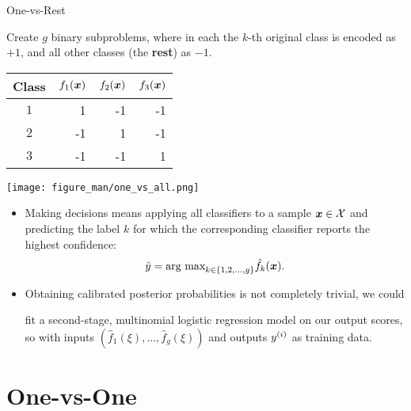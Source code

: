 \begin{vbframe}{One-vs-Rest }


Create $g$ binary subproblems, where in each the $k$-th original class is encoded as $+1$, and all other classes (the \textbf{rest}) as $- 1$.


\begin{table}[]
  \footnotesize
  \begin{tabular}{|c|r|r|r|} \hline
  \textbf{Class}  & \textbf{$f_1{(\bm{x})}$} & \textbf{$f_2{(\bm{x})}$}  & \textbf{$f_3{(\bm{x})}$} \\ \hline
  \textbf{$1$}  &   1                 &  -1                   &  -1                   \\ \hline
  \textbf{$2$}  &  -1                 &  1                   & -1                   \\ \hline
  \textbf{$3$}  &  -1                 & -1                   &  1                   \\ \hline
  \end{tabular}
  \end{table}


    \begin{center}
    \texttt{[image: figure\_man/one\_vs\_all.png]}
    \end{center}

  \begin{itemize}
    \item Making decisions means applying all classifiers to a sample $\bm{x} \in \mathcal{X}$ and predicting the label $k$ for which the corresponding classifier reports the highest confidence: 
    $$
      \hat y = \text{arg max}_{k \in \{1, 2, ..., g\}} \hat f_k(\bm{x}). 
    $$

    \item Obtaining calibrated posterior probabilities is not completely trivial, we could

    fit a second-stage, multinomial logistic regression model on our output scores, so with inputs $\left(\hat f_1(\xi), ..., \hat f_g(\xi)\right)$ and outputs $y^{(i)}$ as training data. 

  \end{itemize}
  \vspace*{0.2cm}


\end{vbframe}


\section{One-vs-One}

